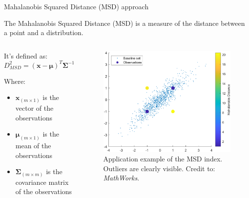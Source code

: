 \begin{frame}{Mahalanobis Squared Distance (MSD) approach}

    The Mahalanobis Squared Distance (MSD) is a measure of the distance between a point and a distribution.


    \begin{columns}[c, onlytextwidth]

        \begin{column}{0.5\textwidth}

            It's defined as:
            \begin{equation}
                D_{MSD}^2 = (\mathbf{x} - \mathbf{\mu})^T \mathbf{\Sigma}^{-1} (\mathbf{x} - \mathbf{\mu})
            \end{equation}

            Where:
            \begin{itemize}
                \item $\mathbf{x}_{(m \times 1)}$ is the vector of the observations
                \item $\mathbf{\mu}_{(m \times 1)}$ is the mean of the observations
                \item $\mathbf{\Sigma}_{(m \times m)}$ is the covariance matrix of the observations
            \end{itemize}

        \end{column}

        \hfill

        \begin{column}{0.45\textwidth}

            \begin{figure}[H]
                \centering
                \includegraphics[width=\textwidth]{img/Mahalanobis-cloud-plot.png}
                \caption{Application example of the MSD index. \textcolor[HTML]{F5EC22}{Outliers} are clearly visible. Credit to: \textit{MathWorks}.}
            \end{figure}


\end{column}
\end{columns}
\end{frame}
